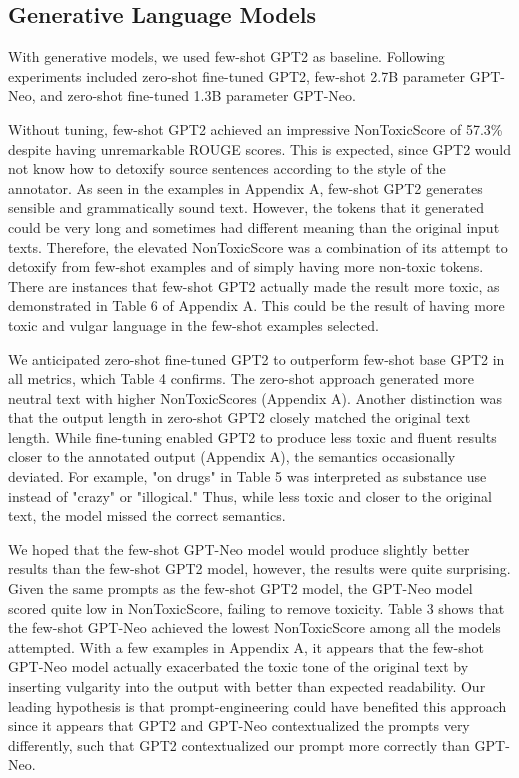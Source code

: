 \documentclass[11pt]{article}
\begin{document}
\subsection{Generative Language Models}

With generative models, we used few-shot GPT2 as baseline. Following experiments included zero-shot fine-tuned GPT2, few-shot 2.7B parameter GPT-Neo, and zero-shot fine-tuned 1.3B parameter GPT-Neo. 

Without tuning, few-shot GPT2 achieved an impressive NonToxicScore of 57.3\% despite having unremarkable ROUGE scores. This is expected, since GPT2 would not know how to detoxify source sentences according to the style of the annotator. As seen in the examples in Appendix A, few-shot GPT2 generates sensible and grammatically sound text. However, the tokens that it generated could be very long and sometimes had different meaning than the original input texts. Therefore, the elevated NonToxicScore was a combination of its attempt to detoxify from few-shot examples and of simply having more non-toxic tokens. There are instances that few-shot GPT2 actually made the result more toxic, as demonstrated in Table 6 of Appendix A. This could be the result of having more toxic and vulgar language in the few-shot examples selected.

We anticipated zero-shot fine-tuned GPT2 to outperform few-shot base GPT2 in all metrics, which Table 4 confirms. The zero-shot approach generated more neutral text with higher NonToxicScores (Appendix A). Another distinction was that the output length in zero-shot GPT2 closely matched the original text length. While fine-tuning enabled GPT2 to produce less toxic and fluent results closer to the annotated output (Appendix A), the semantics occasionally deviated. For example, "on drugs" in Table 5 was interpreted as substance use instead of "crazy" or "illogical." Thus, while less toxic and closer to the original text, the model missed the correct semantics.

We hoped that the few-shot GPT-Neo model would produce slightly better results than the few-shot GPT2 model, however, the results were quite surprising. Given the same prompts as the few-shot GPT2 model, the GPT-Neo model scored quite low in NonToxicScore, failing to remove toxicity. Table 3 shows that the few-shot GPT-Neo achieved the lowest NonToxicScore among all the models attempted. With a few examples in Appendix A, it appears that the few-shot GPT-Neo model actually exacerbated the toxic tone of the original text by inserting vulgarity into the output with better than expected readability. Our leading hypothesis is that prompt-engineering could have benefited this approach since it appears that GPT2 and GPT-Neo contextualized the prompts very differently, such that GPT2 contextualized our prompt more correctly than GPT-Neo. 
\end{document}
